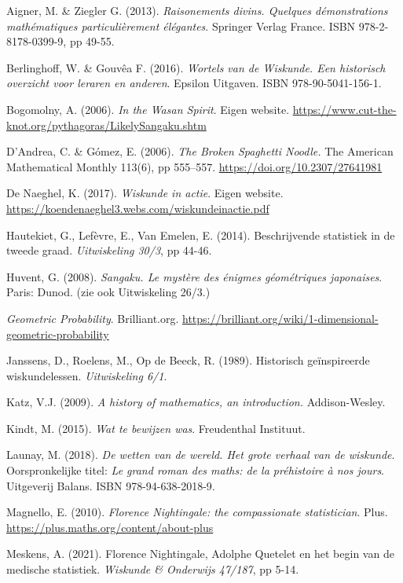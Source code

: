 \begin{bronnen}
	\item Aigner, M. \& Ziegler G. (2013). \textit{Raisonements divins. Quelques démonstrations mathématiques particulièrement élégantes}. Springer Verlag France. ISBN 978-2-8178-0399-9, pp 49-55.
	\item Berlinghoff, W. \& Gouvêa F. (2016). \textit{Wortels van de Wiskunde. Een historisch overzicht voor leraren en anderen}. Epsilon Uitgaven. ISBN 978-90-5041-156-1.
	\item Bogomolny, A. (2006). \textit{In the Wasan Spirit}. Eigen website. \url{https://www.cut-the-knot.org/pythagoras/LikelySangaku.shtm}
	\item D’Andrea, C. \& Gómez, E. (2006). \textit{The Broken Spaghetti Noodle.} The American Mathematical Monthly 113(6), pp 555–557. \url{https://doi.org/10.2307/27641981}
	\item De Naeghel, K. (2017). \textit{Wiskunde in actie}. Eigen website. \url{https://koendenaeghel3.webs.com/wiskundeinactie.pdf}
	\item Hautekiet, G., Lefèvre, E., Van Emelen, E. (2014). Beschrijvende statistiek in de tweede graad. \emph{Uitwiskeling 30/3}, pp 44-46.
	\item Huvent, G. (2008). \textit{Sangaku. Le mystère des énigmes géométriques japonaises}. Paris: Dunod. (zie ook Uitwiskeling 26/3.)
	\item \textit{Geometric Probability}. Brilliant.org. \url{https://brilliant.org/wiki/1-dimensional-geometric-probability}
	\item Janssens, D., Roelens, M., Op de Beeck, R. (1989). Historisch geïnspireerde wiskundelessen. \emph{Uitwiskeling 6/1}.
	\item Katz, V.J. (2009). \textit{A history of mathematics, an introduction.} Addison-Wesley.
	\item Kindt, M. (2015). \textit{Wat te bewijzen was}. Freudenthal Instituut.
	\item Launay, M. (2018). \textit{De wetten van de wereld. Het grote verhaal van de wiskunde}. Oorspronkelijke titel: \textit{Le grand roman des maths: de la préhistoire à nos jours}. Uitgeverij Balans. ISBN 978-94-638-2018-9.
	\item Magnello, E. (2010). \textit{Florence Nightingale: the compassionate statistician}. Plus. \url{https://plus.maths.org/content/about-plus}
	\item Meskens, A. (2021). Florence Nightingale, Adolphe Quetelet en het begin van de medische statistiek. \emph{Wiskunde \& Onderwijs 47/187}, pp 5-14.

\end{bronnen}
